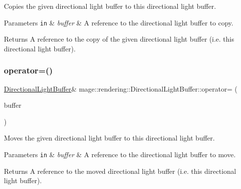 Copies the given directional light buffer to this directional light buffer.


\begin{DoxyParams}[1]{Parameters}
\mbox{\tt in}  & {\em buffer} & A reference to the directional light buffer to copy. \\
\hline
\end{DoxyParams}
\begin{DoxyReturn}{Returns}
A reference to the copy of the given directional light buffer (i.\+e. this directional light buffer). 
\end{DoxyReturn}
\mbox{\label{structmage_1_1rendering_1_1_directional_light_buffer_a65112cac58ae18d14eb9ae65f316b440}} 
\subsubsection{\texorpdfstring{operator=()}{operator=()}\hspace{0.1cm}{\footnotesize\ttfamily [2/2]}}
{\footnotesize\ttfamily \mbox{\hyperlink{structmage_1_1rendering_1_1_directional_light_buffer}{Directional\+Light\+Buffer}}\& mage\+::rendering\+::\+Directional\+Light\+Buffer\+::operator= (\begin{DoxyParamCaption}\item[{\mbox{\hyperlink{structmage_1_1rendering_1_1_directional_light_buffer}{Directional\+Light\+Buffer}} \&\&}]{buffer }\end{DoxyParamCaption})\hspace{0.3cm}{\ttfamily [default]}}

Moves the given directional light buffer to this directional light buffer.


\begin{DoxyParams}[1]{Parameters}
\mbox{\tt in}  & {\em buffer} & A reference to the directional light buffer to move. \\
\hline
\end{DoxyParams}
\begin{DoxyReturn}{Returns}
A reference to the moved directional light buffer (i.\+e. this directional light buffer). 
\end{DoxyReturn}


